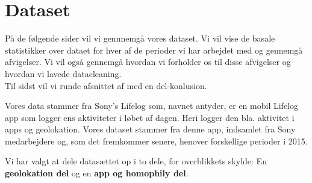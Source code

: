 \section{Dataset}
På de følgende sider vil vi gennnemgå vores dataset. Vi vil vise de basale statistikker over dataet for hver af de perioder vi har arbejdet med og gennemgå afvigelser. Vi vil også gennemgå hvordan vi forholder os til disse afvigelser og hvordan vi lavede datacleaning. \\
Til sidst vil vi runde afsnittet af med en del-konlusion. 

Vores data stammer fra Sony's Lifelog\cite{sonyLifeLog} som, navnet antyder, er en mobil Lifelog app som logger ens aktiviteter i løbet af dagen. Heri logger den bla. aktivitet i apps og geolokation. Vores dataset stammer fra denne app, indsamlet fra Sony medarbejdere og, som det fremkommer senere, henover forskellige perioder i 2015. %

Vi har valgt at dele datasættet op i to dele, for overblikkets skylde: En \textbf{geolokation del} og en \textbf{app og homophily del}.

